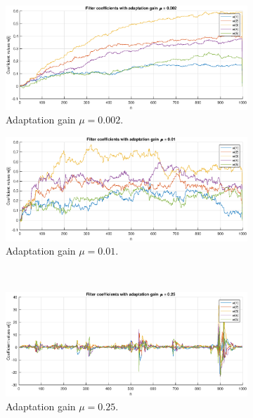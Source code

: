 \begin{figure}[H]
\centering
\begin{subfigure}{.45\textwidth}
  \centering
  \includegraphics[width=\linewidth]{assignment4figs/mu0002.eps}
  \caption{Adaptation gain $\mu = 0.002$.}
\end{subfigure}
\begin{subfigure}{.45\textwidth}
  \centering
  \includegraphics[width=\linewidth]{assignment4figs/mu001.eps} 
  \caption{Adaptation gain $\mu = 0.01$.}
\end{subfigure}\\
\begin{subfigure}{.45\textwidth}
  \centering
  \includegraphics[width=\linewidth]{assignment4figs/mu025.eps} 
  \caption{Adaptation gain $\mu = 0.25$.}
\end{subfigure}
\begin{subfigure}{.45\textwidth}

\end{subfigure}
\end{figure}
